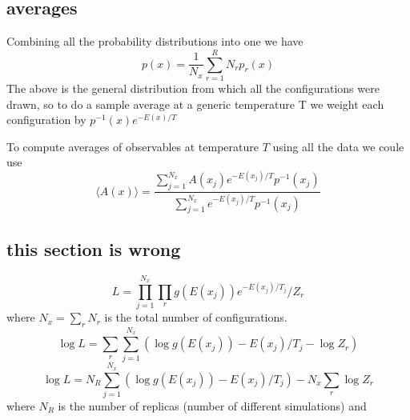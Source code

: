 \documentclass[a4paper]{article}
\begin{document}
\subsection{averages}

Combining all the probability distributions into one we have
\begin{equation}
p(x) = \frac{1}{N_x}  \sum_{r=1}^{R} N_r p_r(x) 
\end{equation}
The above is the general distribution from which all the configurations were drawn, so to do a sample
average at a generic temperature T we weight each configuration by $p^{-1} (x) e^{-E(x)/T}$

To compute averages of observables at temperature $T$ using all the data we coule use
\begin{equation}
\langle A(x) \rangle = \frac{ \sum_{j=1}^{N_x} A(x_j) e^{-E(x_j) / T} p^{-1} (x_j) }
{ \sum_{j=1}^{N_x} e^{-E(x_j) / T} p^{-1} (x_j) }
\end{equation}

\subsection{this section is wrong}

\begin{equation}
L = \prod_{j=1}^{N_x} \prod_{r} g(E(x_j)) e^{-E(x_j) / T_{j} } / Z_{r}
\end{equation}
where $N_{x} = \sum_r N_r$ is the total number of configurations. 
\begin{equation}
\log L =
\sum_{r} \sum_{j=1}^{N_{x}} ( \log g(E(x_j)) -E(x_j) / T_{j} - \log Z_{r} )
\end{equation}
\begin{equation}
\log L =
N_R \sum_{j=1}^{N_{x}} ( \log g(E(x_j)) -E(x_j) / T_{j})
- N_{x} \sum_{r} \log Z_{r}
\end{equation}
where $N_R$ is the number of replicas (number of different simulations) and 
\end{document}
